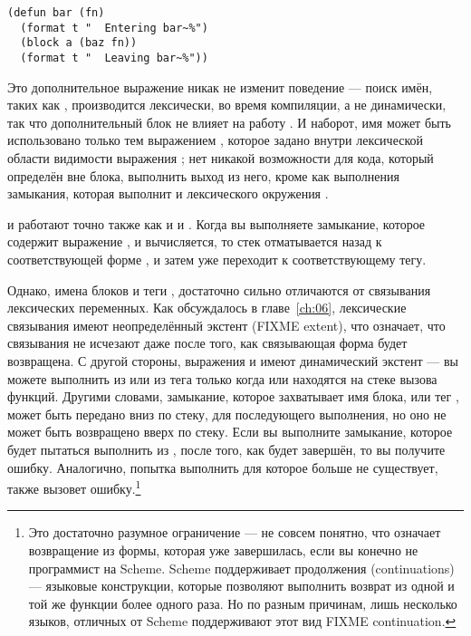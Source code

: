 \begin{lstlisting}
(defun bar (fn)
  (format t "  Entering bar~%")
  (block a (baz fn))
  (format t "  Leaving bar~%"))
\end{lstlisting}

Это дополнительное выражение  никак не изменит поведение  --- поиск
имён, таких как , производится лексически, во время компиляции, а не динамически,
так что дополнительный блок не влияет на работу . И наборот, имя
 может быть использовано только тем выражением , которое
задано внутри лексической области видимости выражения ; нет никакой
возможности для кода, который определён вне блока, выполнить выход из него, кроме как
выполнения замыкания, которая выполнит  и лексического окружения
.

 и  работают точно также как и  и .
Когда вы выполняете замыкание, которое содержит выражение , и 
вычисляется, то стек отматывается назад к соответствующей форме , и затем
уже переходит к соответствующему тегу.

Однако, имена блоков  и теги , достаточно сильно отличаются от
связывания лексических переменных. Как обсуждалось в главе~\ref{ch:06}, лексические
связывания имеют неопределённый экстент (FIXME extent), что означает, что связывания не
исчезают даже после того, как связывающая форма будет возвращена. С другой стороны,
выражения  и  имеют динамический экстент --- вы можете выполнить
 из  или  из тега  только когда
 или  находятся на стеке вызова функций. Другими словами,
замыкание, которое захватывает имя блока, или тег , может быть передано вниз
по стеку, для последующего выполнения, но оно не может быть возвращено вверх по
стеку. Если вы выполните замыкание, которое будет пытаться выполнить  из
, после того, как  будет завершён, то вы получите
ошибку. Аналогично, попытка выполнить  для  которое больше не
существует, также вызовет ошибку.\footnote{Это достаточно разумное ограничение --- не
  совсем понятно, что означает возвращение из формы, которая уже завершилась, если вы
  конечно не программист на Scheme. Scheme поддерживает продолжения (continuations) ---
  языковые конструкции, которые позволяют выполнить возврат из одной и той же функции
  более одного раза. Но по разным причинам, лишь несколько языков, отличных от Scheme
  поддерживают этот вид FIXME continuation.}

